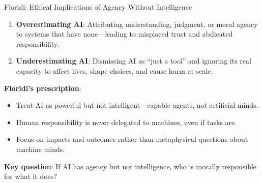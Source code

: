 \documentclass[aspectratio=169,11pt]{beamer}
\begin{document}
\begin{frame}{Floridi: Ethical Implications of Agency Without Intelligence}
\begin{objectionbox}
\small
\begin{enumerate}
    \item \textbf{Overestimating AI}: Attributing understanding, judgment, or moral agency to systems that have none---leading to misplaced trust and abdicated responsibility.
    \item \textbf{Underestimating AI}: Dismissing AI as ``just a tool'' and ignoring its real capacity to affect lives, shape choices, and cause harm at scale.
\end{enumerate}
\end{objectionbox}

\vspace{0.2em}
\textbf{Floridi's prescription}:
\begin{itemize}
    \item Treat AI as powerful but not intelligent---capable agents, not artificial minds.
    \item Human responsibility is never delegated to machines, even if tasks are.
    \item Focus on impacts and outcomes rather than metaphysical questions about machine minds.
\end{itemize}

\vspace{0.2em}
\textbf{Key question}: If AI has agency but not intelligence, who is morally responsible for what it does?
\end{frame}
\end{document}
